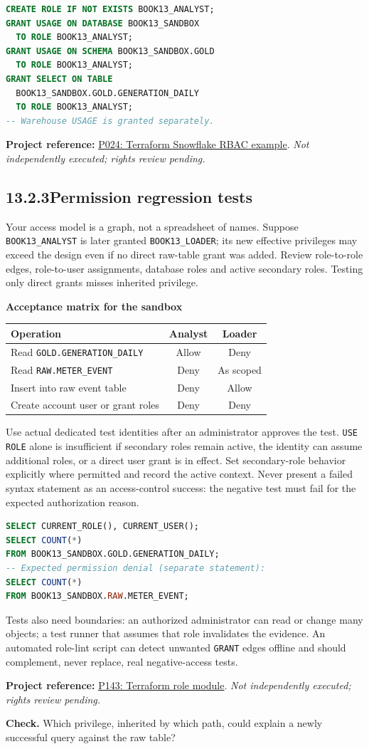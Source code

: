 \documentclass[11pt,twoside]{article}
\newcommand{\topic}[2]{\subsection*{#1\quad #2}}
\newcommand{\repo}[2]{\par\begingroup\fontsize{8.0}{9.6}\selectfont\sffamily\color{inkgray}\textbf{Project reference:} \href{#2}{#1}. \textit{Not independently executed; rights review pending.}\par\endgroup}
\begin{document}
\begin{lstlisting}[language=SQL,caption={Illustrative administrator-approved setup, isolated sandbox.}]
CREATE ROLE IF NOT EXISTS BOOK13_ANALYST;
GRANT USAGE ON DATABASE BOOK13_SANDBOX
  TO ROLE BOOK13_ANALYST;
GRANT USAGE ON SCHEMA BOOK13_SANDBOX.GOLD
  TO ROLE BOOK13_ANALYST;
GRANT SELECT ON TABLE
  BOOK13_SANDBOX.GOLD.GENERATION_DAILY
  TO ROLE BOOK13_ANALYST;
-- Warehouse USAGE is granted separately.
\end{lstlisting}
\repo{P024: Terraform Snowflake RBAC example}{https://github.com/Infostrux-Solutions/terraform-snowflake-rbac-infra}
\newpage
\topic{13.2.3}{Permission regression tests}
Your access model is a graph, not a spreadsheet of names. Suppose \texttt{BOOK13\_ANALYST} is later granted \texttt{BOOK13\_LOADER}; its new effective privileges may exceed the design even if no direct raw-table grant was added. Review role-to-role edges, role-to-user assignments, database roles and active secondary roles. Testing only direct grants misses inherited privilege.

\begin{whitebox}\textbf{Acceptance matrix for the sandbox}\par
\begin{tabularx}{\linewidth}{>{\raggedright\arraybackslash}Xcc}
\toprule
Operation & Analyst & Loader \\
\midrule
Read \texttt{GOLD.GENERATION\_DAILY} & Allow & Deny \\
Read \texttt{RAW.METER\_EVENT} & Deny & As scoped \\
Insert into raw event table & Deny & Allow \\
Create account user or grant roles & Deny & Deny \\
\bottomrule
\end{tabularx}
\end{whitebox}
Use actual dedicated test identities after an administrator approves the test. \texttt{USE ROLE} alone is insufficient if secondary roles remain active, the identity can assume additional roles, or a direct user grant is in effect. Set secondary-role behavior explicitly where permitted and record the active context. Never present a failed syntax statement as an access-control success: the negative test must fail for the expected authorization reason.
\begin{lstlisting}[language=SQL,caption={Reader probe: run only with the approved reader identity.}]
SELECT CURRENT_ROLE(), CURRENT_USER();
SELECT COUNT(*)
FROM BOOK13_SANDBOX.GOLD.GENERATION_DAILY;
-- Expected permission denial (separate statement):
SELECT COUNT(*)
FROM BOOK13_SANDBOX.RAW.METER_EVENT;
\end{lstlisting}
Tests also need boundaries: an authorized administrator can read or change many objects; a test runner that assumes that role invalidates the evidence. An automated role-lint script can detect unwanted \texttt{GRANT} edges offline and should complement, never replace, real negative-access tests.
\repo{P143: Terraform role module}{https://github.com/getindata/terraform-snowflake-role}
\textbf{Check.} Which privilege, inherited by which path, could explain a newly successful query against the raw table?
\newpage
\end{document}
